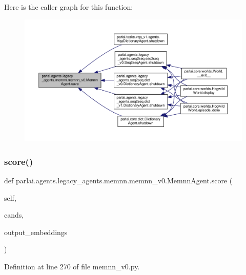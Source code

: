 Here is the caller graph for this function\+:
\nopagebreak
\begin{figure}[H]
\begin{center}
\leavevmode
\includegraphics[width=350pt]{classparlai_1_1agents_1_1legacy__agents_1_1memnn_1_1memnn__v0_1_1MemnnAgent_a20509f6931e68ff52e965d3e214c7b0a_icgraph}
\end{center}
\end{figure}
\mbox{\label{classparlai_1_1agents_1_1legacy__agents_1_1memnn_1_1memnn__v0_1_1MemnnAgent_a29485cab795b6c8abe0a61d9c6bb87fd}} 
\subsubsection{\texorpdfstring{score()}{score()}}
{\footnotesize\ttfamily def parlai.\+agents.\+legacy\+\_\+agents.\+memnn.\+memnn\+\_\+v0.\+Memnn\+Agent.\+score (\begin{DoxyParamCaption}\item[{}]{self,  }\item[{}]{cands,  }\item[{}]{output\+\_\+embeddings }\end{DoxyParamCaption})}



Definition at line 270 of file memnn\+\_\+v0.\+py.




